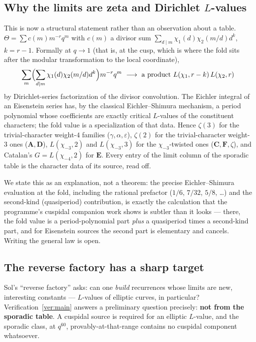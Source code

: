 \documentclass[11pt,reqno]{amsart}
\theoremstyle{plain}
\theoremstyle{definition}
\theoremstyle{remark}
\newcommand{\chim}[1]{\chi_{-#1}}
\begin{document}
\subsection{Why the limits are zeta and Dirichlet $L$-values}
This is now a structural statement rather than an observation about a
table. $\Theta=\sum c(m)m^{-r}q^m$ with $c(m)$ a divisor sum
$\sum_{d\mid m}\chi_1(d)\chi_2(m/d)d^{k}$, $k=r-1$. Formally at $q\to1$
(that is, at the cusp, which is where the fold sits after the modular
transformation to the local coordinate),
\[
\sum_m\Bigl(\sum_{d\mid m}\chi_1(d)\chi_2(m/d)d^{k}\Bigr)m^{-r}q^m
\ \longrightarrow\ \text{a product }L(\chi_1,r-k)\,L(\chi_2,r)
\]
by Dirichlet-series factorization of the divisor convolution. The Eichler
integral of an Eisenstein series has, by the classical Eichler--Shimura
mechanism, a period polynomial whose coefficients are exactly critical
$L$-values of the constituent characters; the fold value is a specialization
of that data. Hence $\zeta(3)$ for the trivial-character weight-$4$
families ($\gamma,\alpha,\varepsilon$), $\zeta(2)$ for the trivial-character
weight-$3$ ones ($\mathbf A,\mathbf D$), $L(\chim3,2)$ and $L(\chim3,3)$
for the $\chim3$-twisted ones ($\mathbf C,\mathbf F,\zeta$), and Catalan's
$G=L(\chim4,2)$ for $\mathbf E$. Every entry of the limit column of the
sporadic table is the character data of its source, read off.

We state this as an explanation, not a theorem: the precise
Eichler--Shimura evaluation at the fold, including the rational prefactor
($1/6$, $7/32$, $5/8$, \dots) and the second-kind (quasiperiod)
contribution, is exactly the calculation that the programme's cuspidal
companion work \cite{cusp} shows is subtler than it looks --- there, the
fold value is a period-polynomial part \emph{plus} a quasiperiod times a
second-kind part, and for Eisenstein sources the second part is elementary
and cancels. Writing the general law is open.

\subsection{The reverse factory has a sharp target}
Sol's ``reverse factory'' asks: can one \emph{build} recurrences whose
limits are new, interesting constants --- $L$-values of elliptic curves, in
particular? Verification~\ref{ver:main} answers a preliminary question
precisely: \textbf{not from the sporadic table}. A cuspidal source is
required for an elliptic $L$-value, and the sporadic class, at $q^{60}$,
provably-at-that-range contains no cuspidal component whatsoever.
\end{document}
